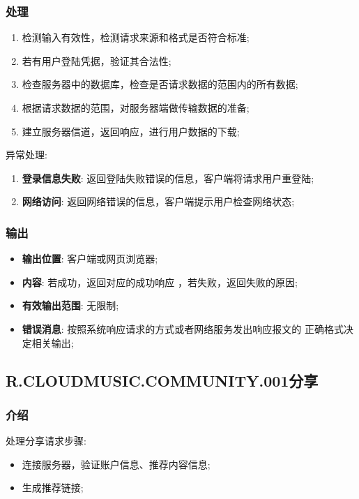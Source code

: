 \subsubsection{处理}
	\begin{enumerate}
		\item 检测输入有效性，检测请求来源和格式是否符合标准;
		\item 若有用户登陆凭据，验证其合法性;
		\item 检查服务器中的数据库，检查是否请求数据的范围内的所有数据;
		\item 根据请求数据的范围，对服务器端做传输数据的准备;
		\item 建立服务器信道，返回响应，进行用户数据的下载;
	\end{enumerate}
	\noindent 异常处理: 
	\begin{enumerate}
		\item \textbf{登录信息失败}: 返回登陆失败错误的信息，客户端将请求用户重登陆;
		\item \textbf{网络访问}: 返回网络错误的信息，客户端提示用户检查网络状态;
	\end{enumerate}
\subsubsection{输出}
\begin{itemize}
	\item \textbf{输出位置}: 客户端或网页浏览器;
	\item \textbf{内容}: 若成功，返回对应的成功响应 ，若失败，返回失败的原因;
	\item \textbf{有效输出范围}: 无限制;
	\item \textbf{错误消息}: 按照系统响应请求的方式或者网络服务发出响应报文的
		正确格式决定相关输出;
\end{itemize}


\subsection{R.CLOUDMUSIC.COMMUNITY.001分享}
\subsubsection{介绍}
	处理分享请求步骤:
	\begin{itemize}
		\item 连接服务器，验证账户信息、推荐内容信息;
		\item 生成推荐链接;
	\end{itemize}
